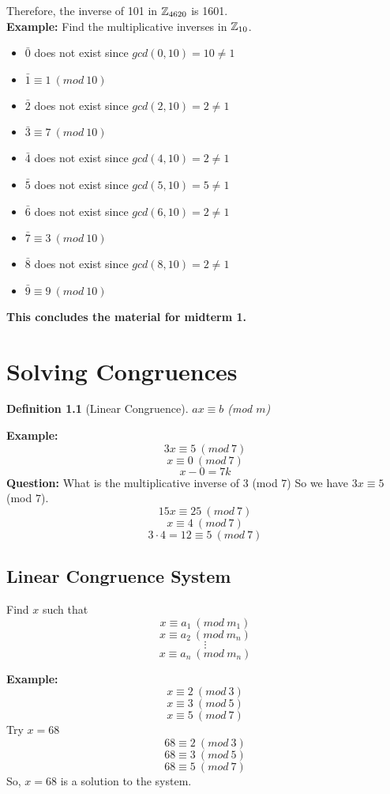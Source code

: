\documentclass[openany]{report}
\newtheorem{definition}{Definition}[section]
\begin{document}
Therefore, the inverse of 101 in $\mathbb{Z}_{4620}$  is 1601. \\[3ex]
\textbf{Example:} Find the multiplicative inverses in $\mathbb{Z}_{10}$.
\begin{itemize}
    \item $\bar{0}$ does not exist since $gcd(0,10) = 10 \neq 1$
    \item $\bar{1} \equiv 1 \ (mod \ 10)$
    \item $\bar{2}$ does not exist since $gcd(2,10) = 2 \neq 1$
    \item $\bar{3} \equiv 7 \ (mod \ 10)$
    \item $\bar{4}$ does not exist since $gcd(4,10) = 2 \neq 1$
    \item $\bar{5}$ does not exist since $gcd(5,10) = 5 \neq 1$
    \item $\bar{6}$ does not exist since $gcd(6,10) = 2 \neq 1$
    \item $\bar{7} \equiv 3 \ (mod \ 10)$
    \item $\bar{8}$ does not exist since $gcd(8,10) = 2 \neq 1$
    \item $\bar{9} \equiv 9 \ (mod \ 10)$
\end{itemize}
\begin{center}
    \textbf{This concludes the material for midterm 1.}
\end{center}
\chapter{Solving Congruences}
\begin{definition}[Linear Congruence]
$ax \equiv b$ (mod $m$)
\end{definition}
\textbf{Example:}
$$3x \equiv 5 \ (mod \ 7)$$
$$x \equiv 0 \ (mod \ 7)$$
$$x - 0 = 7k$$
\textbf{Question:} What is the multiplicative inverse of $3$ (mod $7$)
So we have $3x \equiv 5$ (mod $7$). 
$$15x \equiv 25 \ (mod \ 7)$$
$$x \equiv 4 \ (mod \ 7)$$
$$3 \cdot 4 = 12 \equiv 5 \ (mod \ 7)$$

\section{Linear Congruence System}
Find $x$ such that
$$x \equiv a_1 \ (mod \ m_1)$$
$$x \equiv a_2 \ (mod \ m_n)$$
$$\vdots$$
$$x \equiv a_n \ (mod \ m_n)$$

\textbf{Example:}
$$x \equiv 2\ (mod \ 3)$$
$$x \equiv 3\ (mod \ 5)$$
$$x \equiv 5\ (mod \ 7)$$
Try $x = 68$
$$68 \equiv 2 \ (mod \ 3)$$
$$68 \equiv 3 \ (mod \ 5)$$
$$68 \equiv 5 \ (mod \ 7)$$
So, $x = 68$ is a solution to the system.
\end{document}
